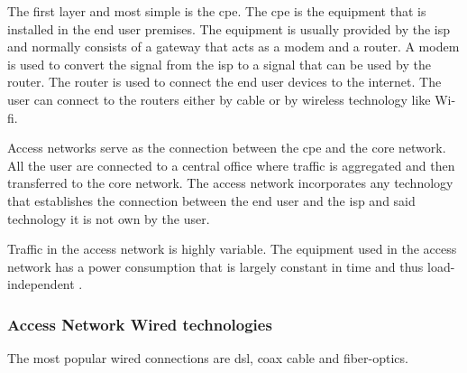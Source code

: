 The first layer and most simple is the \ac{cpe}. The \ac{cpe} is the equipment that is installed in the end user premises. 
The equipment is usually provided by the \ac{isp} and normally consists of a gateway that acts as a modem and a router.
A modem is used to convert the signal from the \ac{isp} to a signal that can be used by the router. The router is used to connect the end user devices to the internet. The user can connect to the routers either by cable or by wireless technology like Wi-fi. 

Access networks serve as the connection between the \ac{cpe} and the core network. All the user are connected to a central office where traffic is aggregated and then transferred to the core network.
The access network incorporates any technology that establishes the connection between the end user and the \ac{isp} and said technology it is not own by the user. %

Traffic in the access network is highly variable. The equipment used in the access network has a power consumption that is largely constant in time and thus load-independent \citet{Heddeghem2011}.

\subsubsection{Access Network Wired technologies}

The most popular wired connections are \ac{dsl}, coax cable and fiber-optics.

